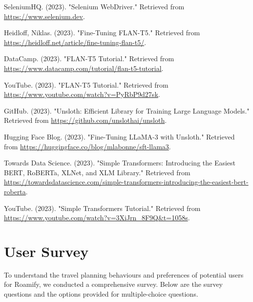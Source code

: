 \documentclass[manuscript,review,anonymous]{acmart}
\begin{document}
\begin{thebibliography}{99}
        SeleniumHQ. (2023). "Selenium WebDriver." Retrieved from \url{https://www.selenium.dev}.

        Heidloff, Niklas. (2023). "Fine-Tuning FLAN-T5." Retrieved from \url{https://heidloff.net/article/fine-tuning-flan-t5/}.

        DataCamp. (2023). "FLAN-T5 Tutorial." Retrieved from \url{https://www.datacamp.com/tutorial/flan-t5-tutorial}.

        YouTube. (2023). "FLAN-T5 Tutorial." Retrieved from \url{https://www.youtube.com/watch?v=PyRbP9d27sk}.
    
        GitHub. (2023). "Unsloth: Efficient Library for Training Large Language Models." Retrieved from \url{https://github.com/unslothai/unsloth}.
    
        Hugging Face Blog. (2023). "Fine-Tuning LLaMA-3 with Unsloth." Retrieved from \url{https://huggingface.co/blog/mlabonne/sft-llama3}.
    
        Towards Data Science. (2023). "Simple Transformers: Introducing the Easiest BERT, RoBERTa, XLNet, and XLM Library." Retrieved from \url{https://towardsdatascience.com/simple-transformers-introducing-the-easiest-bert-roberta}.
    
        YouTube. (2023). "Simple Transformers Tutorial." Retrieved from \url{https://www.youtube.com/watch?v=3XiJrn_8F9Q&t=1058s}.


\end{thebibliography}

\newpage

\appendix

\section{User Survey}
    To understand the travel planning behaviours and preferences of potential users for Roamify, we conducted a comprehensive survey. Below are the survey questions and the options provided for multiple-choice questions.
    \\
\end{document}
